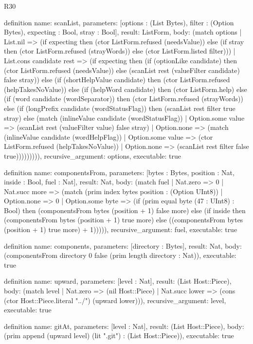 \begin{lexlean}{R30}
\begin{semanticmodule}
definition{
  name: scanList,
  parameters: [options : (List Bytes), filter : (Option Bytes), expecting : Bool, stray : Bool],
  result: ListForm,
  body: (match options
    | List.nil => (if expecting then (ctor ListForm.refused (needsValue)) else (if stray then (ctor ListForm.refused (strayWords)) else (ctor ListForm.listed filter)))
    | List.cons candidate rest => (if expecting then (if (optionLike candidate) then (ctor ListForm.refused (needsValue)) else (scanList rest (valueFilter candidate) false stray)) else (if (shortHelpValue candidate) then (ctor ListForm.refused (helpTakesNoValue)) else (if (helpWord candidate) then (ctor ListForm.help) else (if (word candidate (wordSeparator)) then (ctor ListForm.refused (strayWords)) else (if (longPrefix candidate (wordStatusFlag)) then (scanList rest filter true stray) else (match (inlineValue candidate (wordStatusFlag))
      | Option.some value => (scanList rest (valueFilter value) false stray)
      | Option.none => (match (inlineValue candidate (wordHelpFlag))
        | Option.some value => (ctor ListForm.refused (helpTakesNoValue))
        | Option.none => (scanList rest filter false true))))))))),
  recursive_argument: options,
  executable: true
}

definition{
  name: componentsFrom,
  parameters: [bytes : Bytes, position : Nat, inside : Bool, fuel : Nat],
  result: Nat,
  body: (match fuel
    | Nat.zero => 0
    | Nat.succ more => (match (prim index bytes position : (Option UInt8))
      | Option.none => 0
      | Option.some byte => (if (prim equal byte (47 : UInt8) : Bool) then (componentsFrom bytes (position + 1) false more) else (if inside then (componentsFrom bytes (position + 1) true more) else ((componentsFrom bytes (position + 1) true more) + 1))))),
  recursive_argument: fuel,
  executable: true
}

definition{
  name: components,
  parameters: [directory : Bytes],
  result: Nat,
  body: (componentsFrom directory 0 false (prim length directory : Nat)),
  executable: true
}

definition{
  name: upward,
  parameters: [level : Nat],
  result: (List Host::Piece),
  body: (match level
    | Nat.zero => (nil Host::Piece)
    | Nat.succ lower => (cons (ctor Host::Piece.literal "../") (upward lower))),
  recursive_argument: level,
  executable: true
}

definition{
  name: gitAt,
  parameters: [level : Nat],
  result: (List Host::Piece),
  body: (prim append (upward level) (lit ".git") : (List Host::Piece)),
  executable: true
}


\end{semanticmodule}
\end{lexlean}
